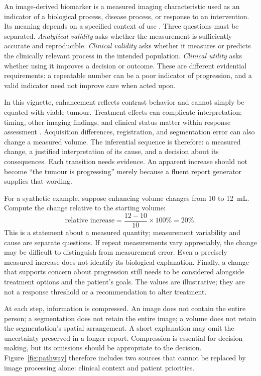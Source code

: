 \documentclass[11pt,a4paper]{article}
\begin{document}
An image-derived biomarker is a measured imaging characteristic used as an indicator of a biological process, disease process, or response to an intervention. Its meaning depends on a specified context of use \citep{best}. Three questions must be separated. \emph{Analytical validity} asks whether the measurement is sufficiently accurate and reproducible. \emph{Clinical validity} asks whether it measures or predicts the clinically relevant process in the intended population. \emph{Clinical utility} asks whether using it improves a decision or outcome. These are different evidential requirements: a repeatable number can be a poor indicator of progression, and a valid indicator need not improve care when acted upon.

In this vignette, enhancement reflects contrast behavior and cannot simply be equated with viable tumour. Treatment effects can complicate interpretation; timing, other imaging findings, and clinical status matter within response assessment \citep{wen2023}. Acquisition differences, registration, and segmentation error can also change a measured volume. The inferential sequence is therefore: a measured change, a justified interpretation of its cause, and a decision about its consequences. Each transition needs evidence. An apparent increase should not become ``the tumour is progressing'' merely because a fluent report generator supplies that wording.

For a synthetic example, suppose enhancing volume changes from 10 to 12~mL. Compute the change relative to the starting volume:
\[
\text{relative increase}=\frac{12-10}{10}\times100\%=20\%.
\]
This is a statement about a measured quantity; measurement variability and cause are separate questions. If repeat measurements vary appreciably, the change may be difficult to distinguish from measurement error. Even a precisely measured increase does not identify its biological explanation. Finally, a change that supports concern about progression still needs to be considered alongside treatment options and the patient's goals. The values are illustrative; they are not a response threshold or a recommendation to alter treatment.

At each step, information is compressed. An image does not contain the entire person; a segmentation does not retain the entire image; a volume does not retain the segmentation's spatial arrangement. A short explanation may omit the uncertainty preserved in a longer report. Compression is essential for decision making, but its omissions should be appropriate to the decision. Figure~\ref{fig:pathway} therefore includes two sources that cannot be replaced by image processing alone: clinical context and patient priorities.
\end{document}
